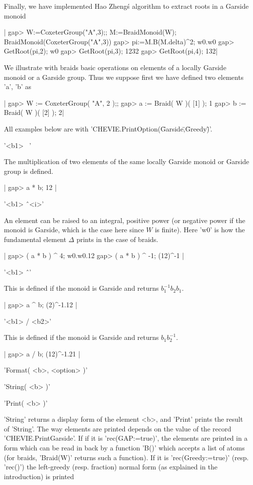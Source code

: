 Finally, we have implemented Hao Zheng\'s algorithm to extract roots
in a Garside monoid\:

|    gap> W:=CoxeterGroup("A",3);; M:=BraidMonoid(W);
    BraidMonoid(CoxeterGroup("A",3))
    gap> pi:=M.B(M.delta)^2;
    w0.w0
    gap> GetRoot(pi,2);
    w0
    gap> GetRoot(pi,3);
    1232
    gap> GetRoot(pi,4);
    132|


We illustrate with braids basic operations on elements of a locally Garside
monoid  or  a  Garside  group.  Thus  we  suppose first we have defined two
elements 'a', 'b' as

|    gap> W := CoxeterGroup( "A", 2 );;
    gap> a := Braid( W )( [1] );
    1
    gap> b := Braid( W )( [2] );
    2|

All examples below are with 'CHEVIE.PrintOption(\"Garside\",\"Greedy\")'.

'<b1> \*\ <b2>'

The multiplication of two elements of the same locally Garside monoid or
Garside group is defined.

|    gap> a * b;
    12 |

'<b1> \^\ <i>'

An  element can be raised to an integral, positive power (or negative power
if the monoid is Garside, which is the case here since $W$ is finite). Here
'w0' is how the fundamental element $\Delta$ prints in the case of braids.

|    gap> ( a * b ) ^ 4;
    w0.w0.12
    gap> ( a * b ) ^ -1;
    (12)^-1 |

'<b1> \^\ <b2>'

This is defined if the monoid is Garside and returns $b_1^{-1}b_2b_1$.

|    gap> a ^ b;
    (2)^-1.12 |

'<b1> / <b2>'

This is defined if the monoid is Garside and returns $b_1b_2^{-1}$.

|    gap> a / b;
    (12)^-1.21 |

'Format( <b>, <option> )'

'String( <b> )'

'Print( <b> )'

'String'  returns a display form of the element <b>, and 'Print' prints the
result  of 'String'. The way  elements are printed depends  on the value of
the  record  'CHEVIE.PrintGarside'.  If  if  it  is  'rec(GAP:=true)',  the
elements  are printed  in a  form which  can be  read in back by a function
'B()'  which accepts a list of atoms (for braids, 'Braid(W)' returns such a
function).  If it  is 'rec(Greedy:=true)'  (resp. 'rec()')  the left-greedy
(resp.  fraction)  normal  form  (as  explained  in  the  introduction)  is
printed\:

